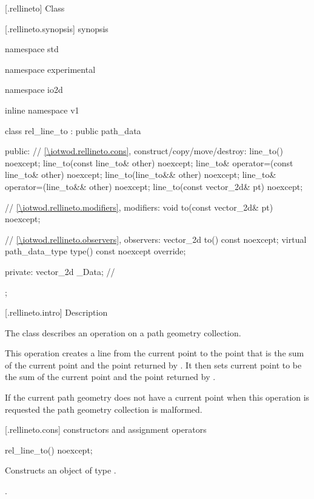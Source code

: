 [\iotwod.rellineto] {Class }

 [\iotwod.rellineto.synopsis] { synopsis}

\begin{codeblock}
namespace std { namespace experimental { namespace io2d { inline namespace v1 {
  class rel_line_to : public path_data {
  public:
    // \ref{\iotwod.rellineto.cons}, construct/copy/move/destroy:
    line_to() noexcept;
    line_to(const line_to& other) noexcept;
    line_to& operator=(const line_to& other) noexcept;
    line_to(line_to&& other) noexcept;
    line_to& operator=(line_to&& other) noexcept;
    line_to(const vector_2d& pt) noexcept;

    // \ref{\iotwod.rellineto.modifiers}, modifiers:
    void to(const vector_2d& pt) noexcept;

    // \ref{\iotwod.rellineto.observers}, observers:
    vector_2d to() const noexcept;
    virtual path_data_type type() const noexcept override;
    
  private:
    vector_2d _Data; // \expos
  };
} } } }
\end{codeblock}

 [\iotwod.rellineto.intro] { Description}

\pnum
{}
The class  describes an operation on a path geometry collection.

\pnum
This operation creates a line from the current point to the point that is the sum of the current point and the point returned by . It then sets current point to be the sum of the current point and the point returned by .

\pnum
If the current path geometry does not have a current point when this operation is requested the path geometry collection is malformed.

 [\iotwod.rellineto.cons] { constructors and assignment operators}

\begin{itemdecl}
    rel_line_to() noexcept;
\end{itemdecl}
\begin{itemdescr}
	\pnum
	\effects
	Constructs an object of type .
	
	\pnum
	\postconditions
	.
\end{itemdescr}

